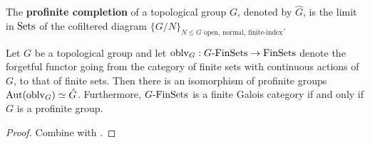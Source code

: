             \begin{definition} \label{def: profinite_completions_of_groups}
                The \textbf{profinite completion} of a topological group $G$, denoted by $\hat{G}$, is the limit in $\mathrm{Sets}$ of the cofiltered diagram $\{G/N\}_{\text{$N \leq G$ open, normal, finite-index}}$. 
            \end{definition}
            \begin{proposition} \label{prop: finite_galois_categories_of_equivariant_finite_sets}
                Let $G$ be a topological group and let $\mathrm{oblv}_G: G\text{-}\mathrm{Fin}\mathrm{Sets} \to \mathrm{Fin}\mathrm{Sets}$ denote the forgetful functor going from the category of finite sets with continuous actions of $G$, to that of finite sets. Then there is an isomorphism of profinite groups $\mathrm{Aut}(\mathrm{oblv}_G) \simeq \hat{G}$. Furthermore, $G\text{-}\mathrm{Fin}\mathrm{Sets}$ is a finite Galois category if and only if $G$ is a profinite group. 
            \end{proposition}
                \begin{proof}
                    Combine \cite[IV.2.4 et IV.2.7]{sga4} with \cite[\href{https://stacks.math.columbia.edu/tag/0BMU}{Tag 0BMU}]{stacks}.
                \end{proof}
                
